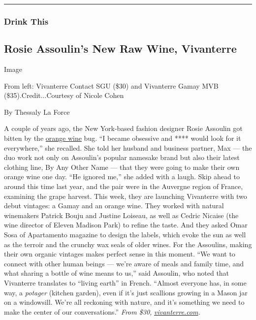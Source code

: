 \begin{center}\rule{0.5\linewidth}{\linethickness}\end{center}

\hypertarget{drink-this}{%
\subsubsection{Drink This}\label{drink-this}}

\hypertarget{rosie-assoulins-new-raw-wine-vivanterre}{%
\subsection{Rosie Assoulin's New Raw Wine,
Vivanterre}\label{rosie-assoulins-new-raw-wine-vivanterre}}

Image

From left: Vivanterre Contact SGU (\$30) and Vivanterre Gamay MVB
(\$35).Credit...Courtesy of Nicole Cohen

By Thessaly La Force

A couple of years ago, the New York-based fashion designer Rosie
Assoulin got bitten by the
\href{https://www.nytimes3xbfgragh.onion/2020/05/07/dining/drinks/orange-wine-skin-contact.html}{orange
wine} bug. ``I became obsessive and **** would look for it everywhere,''
she recalled. She told her husband and business partner, Max --- the duo
work not only on Assoulin's popular namesake brand but also their latest
clothing line, By Any Other Name --- that they were going to make their
own orange wine one day. ``He ignored me,'' she added with a laugh. Skip
ahead to around this time last year, and the pair were in the Auvergne
region of France, examining the grape harvest. This week, they are
launching Vivanterre with two debut vintages: a Gamay and an orange
wine. They worked with natural winemakers Patrick Bouju and Justine
Loiseau, as well as Cedric Nicaise (the wine director of Eleven Madison
Park) to refine the taste. And they asked Omar Sosa of Apartamento
magazine to design the labels, which evoke the sun as well as the
terroir and the crunchy wax seals of older wines. For the Assoulins,
making their own organic vintages makes perfect sense in this moment.
``We want to connect with other human beings --- we're aware of meals
and family time, and what sharing a bottle of wine means to us,'' said
Assoulin, who noted that Vivanterre translates to ``living earth'' in
French. ``Almost everyone has, in some way, a \emph{potager} (kitchen
garden), even if it's just scallions growing in a Mason jar on a
windowsill. We're all reckoning with nature, and it's something we need
to make the center of our conversations.'' \emph{From \$30,}
\href{https://vivanterre.com}{\emph{vivanterre.com}}\emph{.}

